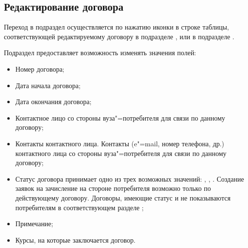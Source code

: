 \subsection{Редактирование договора}\label{agreement:edit_section}
Переход в подраздел осуществляется по нажатию иконки   в строке таблицы, соответствующей редактируемому  договору в подразделе , или в подразделе .

Подраздел предоставляет возможность изменять значения полей:
\begin{itemize}
	\item Номер договора;
	\item Дата начала договора;
	\item Дата окончания договора;
	\item Контактное лицо со стороны вуза"=потребителя для связи по данному договору;
	\item Контакты контактного лица. Контакты (e"=mail, номер телефона, др.) контактного лица со стороны вуза"=потребителя для связи по данному договору;
	\item Статус договора принимает одно из трех возможных значений: ,  ,  . Создание заявок на зачисление на стороне потребителя возможно только по действующему договору. Договоры, имеющие статус   и  не показываются потребителям в соответствующем разделе ;
	\item Примечание;
	\item Курсы, на которые заключается договор.
\end{itemize}

